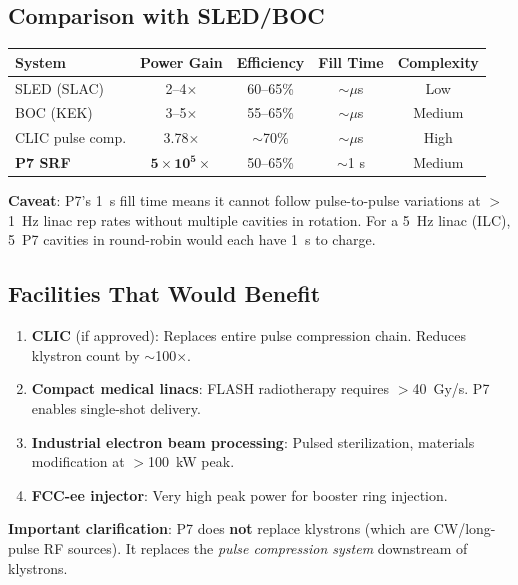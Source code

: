 \documentclass[11pt]{article}
\newcommand{\ee}[1]{\times 10^{#1}}
\begin{document}
\subsection{Comparison with SLED/BOC}

\begin{center}
\begin{tabular}{lcccc}
\toprule
System & Power Gain & Efficiency & Fill Time & Complexity \\
\midrule
SLED (SLAC) & 2--4$\times$ & 60--65\% & $\sim\mu$s & Low \\
BOC (KEK) & 3--5$\times$ & 55--65\% & $\sim\mu$s & Medium \\
CLIC pulse comp. & 3.78$\times$ & $\sim$70\% & $\sim\mu$s & High \\
\textbf{P7 SRF} & $\mathbf{5\ee{5}\times}$ & 50--65\% & $\sim$1 s & Medium \\
\bottomrule
\end{tabular}
\end{center}

\textbf{Caveat}: P7's 1~s fill time means it cannot follow
pulse-to-pulse variations at $>$1~Hz linac rep rates without
multiple cavities in rotation. For a 5~Hz linac (ILC), 5~P7
cavities in round-robin would each have 1~s to charge.

\subsection{Facilities That Would Benefit}

\begin{enumerate}[nosep]
  \item \textbf{CLIC} (if approved): Replaces entire pulse
    compression chain. Reduces klystron count by $\sim$100$\times$.
  \item \textbf{Compact medical linacs}: FLASH radiotherapy
    requires $>$40~Gy/s. P7 enables single-shot delivery.
  \item \textbf{Industrial electron beam processing}: Pulsed
    sterilization, materials modification at $>$100~kW peak.
  \item \textbf{FCC-ee injector}: Very high peak power
    for booster ring injection.
\end{enumerate}

\textbf{Important clarification}: P7 does \textbf{not} replace
klystrons (which are CW/long-pulse RF sources). It replaces the
\emph{pulse compression system} downstream of klystrons.

\end{document}
